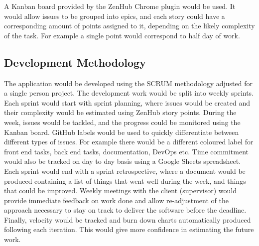 A Kanban board provided by the ZenHub Chrome plugin\cite{32} would be used. It would allow issues to be grouped
into epics, and each story could have a corresponding amount of points assigned to it, depending
on the likely complexity of the task. For example a single point would correspond to half day of work.

\subsection{Development Methodology}
\label{subsection:scrum}
The application would be developed using the SCRUM methodology adjusted for a single person project.
The development work would be split into weekly sprints. Each sprint would start with sprint
planning, where issues would be created and their complexity would be estimated using ZenHub
story points. During the week, issues would be tackled, and the progress could be monitored using
the Kanban board. GitHub labels would be used to quickly differentiate between different types
of issues. For example there would be a different coloured label for front end tasks, back end
tasks, documentation, DevOps etc. Time commitment would also be tracked on day to day basis
using a Google Sheets spreadsheet\cite{33}. Each sprint would end with a sprint retrospective, where
a document would be produced containing a list of things that went well during the week, and things
that could be improved. Weekly meetings with the client (supervisor) would provide immediate feedback
on work done and allow re-adjustment of the approach necessary to stay on track to deliver the
software before the deadline. Finally, velocity would be tracked and burn down charts automatically
produced following each iteration. This would give more confidence in estimating the future work.


